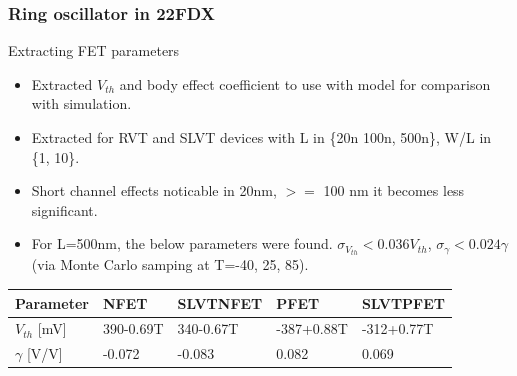 \documentclass[t, screen, aspectratio=43]{beamer}
\begin{document}
\begin{frame}
	\frametitle{Ring oscillator in 22FDX}
	\begin{block}{Extracting FET parameters}
		\begin{itemize}
			\scriptsize
			\item Extracted $V_{th}$ and body effect coefficient to use with model for comparison with simulation.
			\item Extracted for RVT and SLVT devices with L in \{20n 100n, 500n\}, W/L in \{1, 10\}.
			\item Short channel effects noticable in 20nm, $>=$ 100 nm it becomes less significant. 
			\item For L=500nm, the below parameters were found. $\sigma_{V_{th}} < 0.036 V_{th}$, $\sigma_{\gamma} < 0.024 \gamma$ (via Monte Carlo samping at T=-40, 25, 85).
		\end{itemize}    
		\begin{table}[htb!]
			\tiny
			\centering
			\def\arraystretch{1.5}		
			\setlength\arrayrulewidth{0.75pt}
			\setlength{\tabcolsep}{1em} %
			\begin{tabular}{|l|l|l|l|l|}
				\hline 
				\rule[-1ex]{0pt}{2.5ex} \cellcolor{gray!40}\textbf{Parameter} & \cellcolor{gray!40}\textbf{NFET} & \cellcolor{gray!40}\textbf{SLVTNFET}& \cellcolor{gray!40}\textbf{PFET} & \cellcolor{gray!40}\textbf{SLVTPFET} \\ 
				\hline 
				\rule[-1ex]{0pt}{2.5ex} $V_{th}$ [mV] & 390-0.69T & 340-0.67T & -387+0.88T & -312+0.77T\\ 
				\hline 
				\rule[-1ex]{0pt}{2.5ex} $\gamma $ [V/V]  & -0.072 & -0.083 & 0.082 & 0.069\\ 
				\hline 
			\end{tabular} 
		\end{table}   
	\end{block}
\end{frame}
\end{document}

